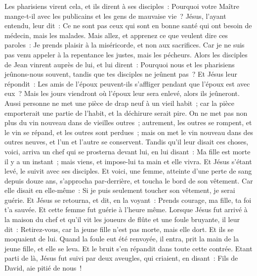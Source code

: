 \begin{multicols}{2}
Les pharisiens virent cela, et ils dirent à ses disciples~: Pourquoi votre Maître mange-t-il avec les publicains et les gens de mauvaise vie~?
Jésus, l'ayant entendu, leur dit~: Ce ne sont pas ceux qui sont en bonne santé qui ont besoin de médecin, mais les malades.
Mais allez, et apprenez ce que veulent dire ces paroles~: Je prends plaisir à la miséricorde, et non aux sacrifices. Car je ne suis pas venu appeler à la repentance les justes, mais les pécheurs.
Alors les disciples de Jean vinrent auprès de lui, et lui dirent~: Pourquoi nous et les pharisiens jeûnons-nous souvent, tandis que tes disciples ne jeûnent pas~?
Et Jésus leur répondit~: Les amis de l'époux peuvent-ils s'affliger pendant que l'époux est avec eux~? Mais les jours viendront où l'époux leur sera enlevé, alors ils jeûneront.
Aussi personne ne met une pièce de drap neuf à un vieil habit~; car la pièce emporterait une partie de l'habit, et la déchirure serait pire.
On ne met pas non plus du vin nouveau dans de vieilles outres~; autrement, les outres se rompent, et le vin se répand, et les outres sont perdues~; mais on met le vin nouveau dans des outres neuves, et l'un et l'autre se conservent.
Tandis qu'il leur disait ces choses, voici, arriva un chef qui se prosterna devant lui, en lui disant~: Ma fille est morte il y a un instant~; mais viens, et impose-lui ta main et elle vivra.
Et Jésus s'étant levé, le suivit avec ses disciples.
Et voici, une femme, atteinte d'une perte de sang depuis douze ans, s'approcha par-derrière, et toucha le bord de son vêtement.
Car elle disait en elle-même~: Si je puis seulement toucher son vêtement, je serai guérie.
Et Jésus se retourna, et dit, en la voyant~: Prends courage, ma fille, ta foi t'a sauvée. Et cette femme fut guérie à l'heure même.
Lorsque Jésus fut arrivé à la maison du chef et qu'il vit les joueurs de flûte et une foule bruyante,
il leur dit~: Retirez-vous, car la jeune fille n'est pas morte, mais elle dort. Et ils se moquaient de lui.
Quand la foule eut été renvoyée, il entra, prit la main de la jeune fille, et elle se leva.
Et le bruit s'en répandit dans toute cette contrée.
Etant parti de là, Jésus fut suivi par deux aveugles, qui criaient, en disant~: Fils de David, aie pitié de nous~!

\end{multicols}

